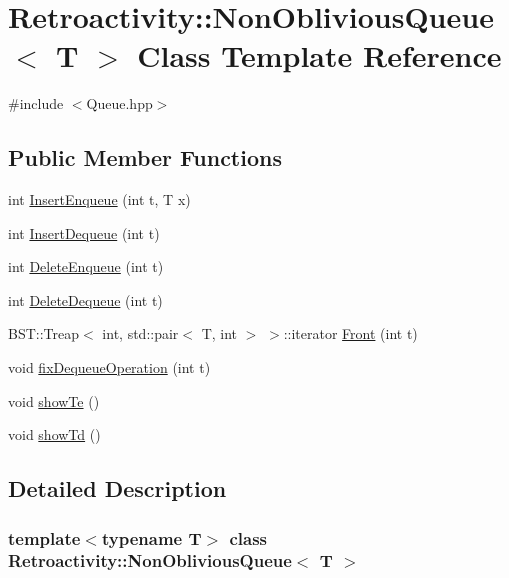 \hypertarget{classRetroactivity_1_1NonObliviousQueue}{}\section{Retroactivity\+:\+:Non\+Oblivious\+Queue$<$ T $>$ Class Template Reference}
\label{classRetroactivity_1_1NonObliviousQueue}


{\ttfamily \#include $<$Queue.\+hpp$>$}

\subsection*{Public Member Functions}
\begin{DoxyCompactItemize}
\item 
int \hyperlink{classRetroactivity_1_1NonObliviousQueue_a725f518de41fb73143c2a344624c07f1}{Insert\+Enqueue} (int t, T x)
\item 
int \hyperlink{classRetroactivity_1_1NonObliviousQueue_addbc4d69607c4780858457a24870b3f1}{Insert\+Dequeue} (int t)
\item 
int \hyperlink{classRetroactivity_1_1NonObliviousQueue_a3930425303a0a5c11a0cf0770ff30717}{Delete\+Enqueue} (int t)
\item 
int \hyperlink{classRetroactivity_1_1NonObliviousQueue_a18ae9cd695ecce640c2fc9986f05cecf}{Delete\+Dequeue} (int t)
\item 
B\+S\+T\+::\+Treap$<$ int, std\+::pair$<$ T, int $>$ $>$\+::iterator \hyperlink{classRetroactivity_1_1NonObliviousQueue_a2ba6cd80f76e1bb99a0b569962be0b9e}{Front} (int t)
\item 
void \hyperlink{classRetroactivity_1_1NonObliviousQueue_af5bff7651623702e8b3546a4e5055a5d}{fix\+Dequeue\+Operation} (int t)
\item 
void \hyperlink{classRetroactivity_1_1NonObliviousQueue_a4682494399cc4da59dcef0d0cbb1df14}{show\+Te} ()
\item 
void \hyperlink{classRetroactivity_1_1NonObliviousQueue_a006b0d3710fad54f61e620f95dd3c67c}{show\+Td} ()
\end{DoxyCompactItemize}


\subsection{Detailed Description}
\subsubsection*{template$<$typename T$>$\newline
class Retroactivity\+::\+Non\+Oblivious\+Queue$<$ T $>$}

